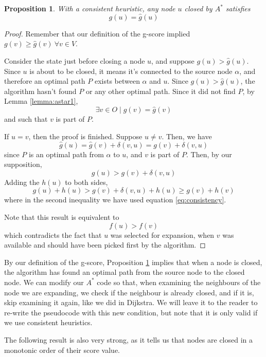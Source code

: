 \documentclass[12pt]{report}
\newtheorem{proposition}[theorem]{Proposition}
\begin{document}
\begin{proposition}
\label{prop:closed-optimal}
With a consistent heuristic, any node $u$ closed by $A^*$ satisfies
\[ g(u) = \hat{g}(u) \]
\end{proposition}
\begin{proof}
Remember that our definition of the g-score implied $g(v) \geq \hat{g}(v) \ \forall v \in V$.

Consider the state just before closing a node $u$, and suppose $g(u) > \hat{g}(u)$. Since $u$ is about to be closed, it means it's connected to the source node $\alpha$, and therefore an optimal path $P$ exists between $\alpha$ and $u$. Since $g(u) > \hat{g}(u)$, the algorithm hasn't found $P$ or any other optimal path. Since it did not find $P$, by Lemma \ref{lemma:astar1},
\[ \exists v \in O \mid g(v) = \hat{g}(v) \]
and such that $v$ is part of $P$.

If $u = v$, then the proof is finished. Suppose $u \neq v$. Then, we have
\[ \hat{g}(u) = \hat{g}(v) + \delta(v, u) = g(v) + \delta(v, u) \]
since $P$ is an optimal path from $\alpha$ to $u$, and $v$ is part of $P$. Then, by our supposition,
\[ g(u) > g(v) + \delta(v, u) \]
Adding the $h(u)$ to both sides,
\[ g(u) + h(u) > g(v) + \delta(v, u) + h(u) \geq g(v) + h(v) \]
where in the second inequality we have used equation \ref{eq:consistency}.

Note that this result is equivalent to
\[ f(u) > f(v) \]
which contradicts the fact that $u$ was selected for expansion, when $v$ was available and should have been picked first by the algorithm.
\end{proof}

By our definition of the g-score, Proposition \ref{prop:closed-optimal} implies that when a node is closed, the algorithm has found an optimal path from the source node to the closed node. We can modify our $A^*$ code so that, when examining the neighbours of the node we are expanding, we check if the neighbour is already closed, and if it is, skip examining it again, like we did in Dijkstra. We will leave it to the reader to re-write the pseudocode with this new condition, but note that it is only valid if we use consistent heuristics.

The following result is also very strong, as it tells us that nodes are closed in a monotonic order of their score value.
\end{document}
